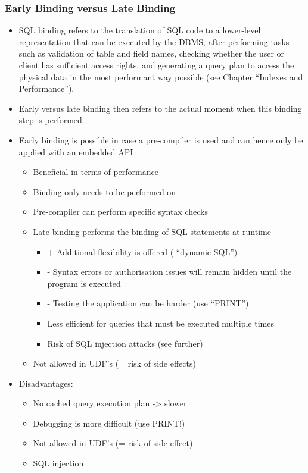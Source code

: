 \documentclass{report}
\begin{document}
    \subsubsection{Early Binding versus Late Binding}
    \begin{itemize} 
        \item SQL binding refers to the translation of SQL code to a lower-level representation that can be executed by the DBMS, after performing tasks such as validation of table and field names, checking whether the user or client has sufficient access rights, and generating a query plan to access the physical data in the most performant way possible (see Chapter ``Indexes and Performance'').
        \item Early versus late binding then refers to the actual moment when this binding step is performed.
        \item Early binding is possible in case a pre-compiler is used and can hence only be applied with an embedded API
            \begin{itemize} 
                \item Beneficial in terms of performance
                \item Binding only needs to be performed on
                \item Pre-compiler can perform specific syntax checks
                \item Late binding performs the binding of SQL-statements at runtime
                    \begin{itemize} 
                        \item + Additional flexibility is offered ( ``dynamic SQL'')
                        \item - Syntax errors or authorisation issues will remain hidden until the program is executed
                        \item - Testing the application can be harder (use ``PRINT'')
                        \item Less efficient for queries that must be executed multiple times
                        \item Risk of SQL injection attacks (see further)
                    \end{itemize}
                \item Not allowed in UDF's (= risk of side effects)
            \end{itemize}
        \item Disadvantages:
            \begin{itemize} 
                \item No cached query execution plan -> slower
                \item Debugging is more difficult (use PRINT!)
                \item Not allowed in UDF's (= risk of side-effect)
                \item SQL injection
            \end{itemize}
    \end{itemize}
\end{document}
